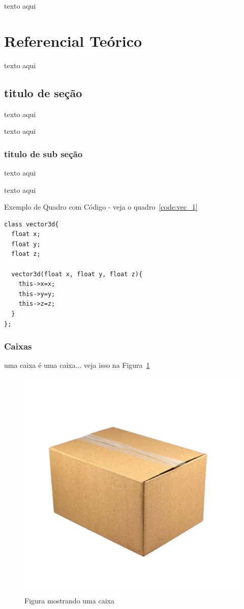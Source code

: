 texto aqui
\section{Referencial Teórico}

texto aqui

\subsection{titulo de seção}

texto aqui 

texto aqui 

\subsubsection{titulo de sub seção}
texto aqui 

texto aqui

Exemplo de Quadro com Código - veja o quadro~\ref{code:vec_1}
\begin{lstlisting}[frame=single,caption=Exemplo de vetor 3d\label{code:vec_1}]
class vector3d{
  float x;
  float y;
  float z;

  vector3d(float x, float y, float z){
    this->x=x;
    this->y=y;
    this->z=z;
  }
};
\end{lstlisting}

\subsubsection{Caixas}

uma caixa é uma caixa... veja isso na Figura~\ref{fig:figura1}


\begin{figure}[htb]
  \centering
	\caption{\label{fig:figura1} Figura mostrando uma caixa}
	\includegraphics[scale=0.2,frame]{Imagens/figura1.png} %
\end{figure}





